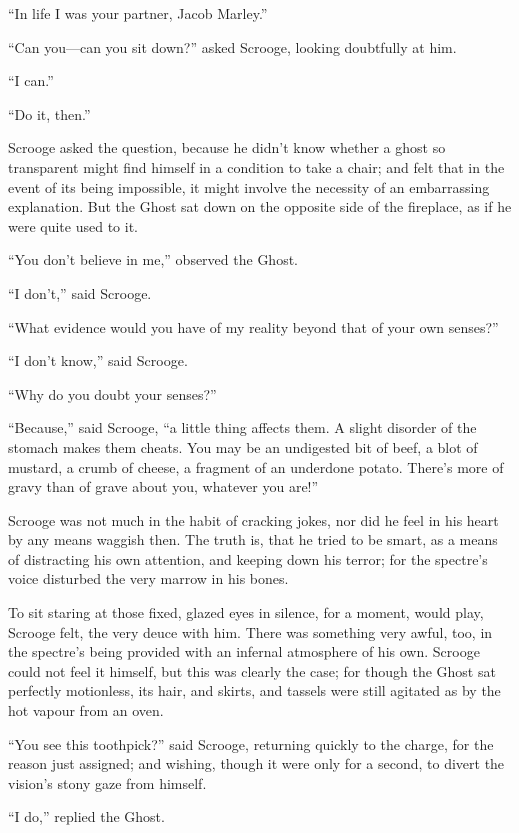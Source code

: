 \documentclass[paper=a5,BCOR=15mm,twoside,DIV=15,headinclude=off,12pt,chapterprefix=off,openany,headings=huge]{scrbook} %
\begin{document}
\enquote{In life I was your partner, Jacob Marley.}

\enquote{Can you—can you sit down?} asked Scrooge, looking doubtfully at him.

\enquote{I can.}

\enquote{Do it, then.}

Scrooge asked the question, because he didn't know whether a ghost so transparent might find himself in a condition to take a chair; and felt that in the event of its being impossible, it might involve the necessity of an embarrassing explanation. But the Ghost sat down on the opposite side of the fireplace, as if he were quite used to it.

\enquote{You don't believe in me,} observed the Ghost.

\enquote{I don't,} said Scrooge.

\enquote{What evidence would you have of my reality beyond that of your own senses?}

\enquote{I don't know,} said Scrooge.

\enquote{Why do you doubt your senses?}

\enquote{Because,} said Scrooge, \enquote{a little thing affects them. A slight disorder of the stomach makes them cheats. You may be an undigested bit of beef, a blot of mustard, a crumb of cheese, a fragment of an underdone potato. There's more of gravy than of grave about you, whatever you are!}

Scrooge was not much in the habit of cracking jokes, nor did he feel in his heart by any means waggish then. The truth is, that he tried to be smart, as a means of distracting his own attention, and keeping down his terror; for the spectre's voice disturbed the very marrow in his bones.

To sit staring at those fixed, glazed eyes in silence, for a moment, would play, Scrooge felt, the very deuce with him. There was something very awful, too, in the spectre's being provided with an infernal atmosphere of his own. Scrooge could not feel it himself, but this was clearly the case; for though the Ghost sat perfectly motionless, its hair, and skirts, and tassels were still agitated as by the hot vapour from an oven.

\enquote{You see this toothpick?} said Scrooge, returning quickly to the charge, for the reason just assigned; and wishing, though it were only for a second, to divert the vision's stony gaze from himself.

\enquote{I do,} replied the Ghost.
\end{document}
